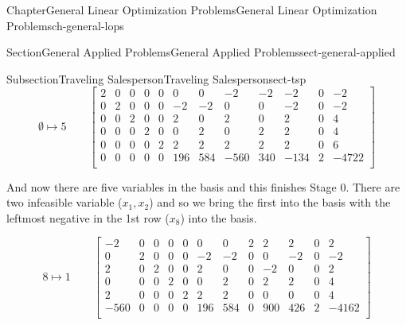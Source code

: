 \documentclass[oneside,10pt,]{book}
\numberwithin{equation}{section}
\newcommand{\amp}{&}
\begin{document}
\begin{chapterptx}{Chapter}{General Linear Optimization Problems}{}{General Linear Optimization Problems}{}{}{ch-general-lops}
\begin{sectionptx}{Section}{General Applied Problems}{}{General Applied Problems}{}{}{sect-general-applied}
\begin{subsectionptx}{Subsection}{Traveling Salesperson}{}{Traveling Salesperson}{}{}{sect-tsp}
\begin{equation*}
\emptyset \mapsto 5 \qquad \left[\begin{array}{rrrrr|rrrrrr|r} 2 \amp 0 \amp 0 \amp 0 \amp 0 \amp 0 \amp 0 \amp -2 \amp -2 \amp -2 \amp 0 \amp -2\\ 0 \amp 2 \amp 0 \amp 0 \amp 0 \amp -2 \amp -2 \amp 0 \amp 0 \amp -2 \amp 0 \amp -2\\ 0 \amp 0 \amp 2 \amp 0 \amp 0 \amp 2 \amp 0 \amp 2 \amp 0 \amp 2 \amp 0 \amp 4\\ 0 \amp 0 \amp 0 \amp 2 \amp 0 \amp 0 \amp 2 \amp 0 \amp 2 \amp 2 \amp 0 \amp 4\\ 0 \amp 0 \amp 0 \amp 0 \amp 2 \amp 2 \amp 2 \amp 2 \amp 2 \amp 2 \amp 0 \amp 6\\ \hline 0 \amp 0 \amp 0 \amp 0 \amp 0 \amp 196 \amp 584 \amp -560 \amp 340 \amp -134 \amp 2 \amp -4722\\ \end{array} \right]
\end{equation*}
%
\par
And now there are five variables in the basis and this finishes Stage 0. There are two infeasible variable (\(x_1, x_2\)) and so we bring the first into the basis with the leftmost negative in the 1st row (\(x_8\)) into the basis.%
\par
%
\begin{equation*}
8 \mapsto 1 \qquad \left[\begin{array}{rrrrrr|rrrrr|r} -2 \amp 0 \amp 0 \amp 0 \amp 0 \amp 0 \amp 0 \amp 2 \amp 2 \amp 2 \amp 0 \amp 2\\ 0 \amp 2 \amp 0 \amp 0 \amp 0 \amp -2 \amp -2 \amp 0 \amp 0 \amp -2 \amp 0 \amp -2\\ 2 \amp 0 \amp 2 \amp 0 \amp 0 \amp 2 \amp 0 \amp 0 \amp -2 \amp 0 \amp 0 \amp 2\\ 0 \amp 0 \amp 0 \amp 2 \amp 0 \amp 0 \amp 2 \amp 0 \amp 2 \amp 2 \amp 0 \amp 4\\ 2 \amp 0 \amp 0 \amp 0 \amp 2 \amp 2 \amp 2 \amp 0 \amp 0 \amp 0 \amp 0 \amp 4\\ \hline -560 \amp 0 \amp 0 \amp 0 \amp 0 \amp 196 \amp 584 \amp 0 \amp 900 \amp 426 \amp 2 \amp -4162\\ \end{array} \right]
\end{equation*}
%
\par
%
\begin{equation*}

\end{equation*}
\end{subsectionptx}
\end{sectionptx}
\end{chapterptx}
\end{document}
